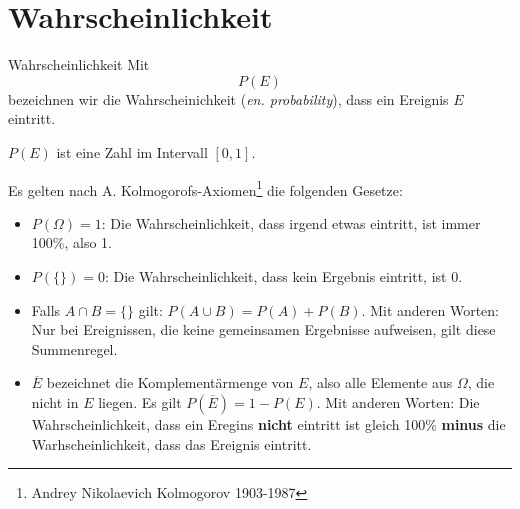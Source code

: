 
\section{Wahrscheinlichkeit}
\begin{definition}{Wahrscheinlichkeit}{}
Mit $$P(E)$$ bezeichnen wir die Wahrscheinichkeit (\textit{en. probability}), dass ein Ereignis $E$ eintritt.

$P(E)$ ist eine Zahl im Intervall $[0,1]$.
\end{definition}

Es gelten nach A. Kolmogorofs-Axiomen\footnote{Andrey Nikolaevich Kolmogorov 1903-1987} die folgenden Gesetze:

\begin{gesetz}{}{}
\begin{itemize}
\item $P(\Omega) = 1$: Die Wahrscheinlichkeit, dass irgend etwas eintritt, ist immer 100\%, also 1.
\item $P(\{\}) = 0$: Die Wahrscheinlichkeit, dass kein Ergebnis eintritt, ist 0.
\item Falls $A \cap B = \{\}$ gilt: $P(A\cup B) = P(A) + P(B)$. Mit anderen Worten: Nur bei Ereignissen, die keine gemeinsamen Ergebnisse aufweisen, gilt diese Summenregel.
\item $\overline{E}$ bezeichnet die Komplementärmenge von $E$, also alle Elemente aus $\Omega$, die nicht in $E$ liegen. Es gilt $P(\overline{E}) = 1-P(E)$. Mit anderen Worten: Die Wahrscheinlichkeit, dass ein Eregins \textbf{nicht} eintritt ist gleich 100\% \textbf{minus} die Warhscheinlichkeit, dass das Ereignis eintritt.
\end{itemize}
\end{gesetz}

\newpage

